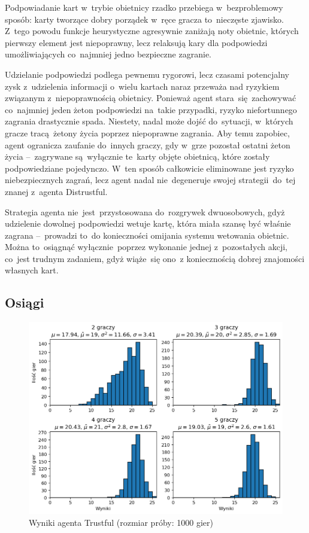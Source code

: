\documentclass[declaration,shortabstract,inz]{iithesis}
\begin{document}
Podpowiadanie kart w~trybie obietnicy rzadko przebiega w~bezproblemowy sposób: karty tworzące dobry porządek w~ręce gracza to~nieczęste zjawisko. Z~tego powodu funkcje heurystyczne agresywnie zaniżają noty obietnic, których pierwszy element jest niepoprawny, lecz relaksują kary dla podpowiedzi umożliwiających co~najmniej jedno bezpieczne zagranie.

Udzielanie podpowiedzi podlega pewnemu rygorowi, lecz czasami potencjalny zysk z~udzielenia informacji o~wielu kartach naraz przeważa nad ryzykiem związanym z~niepoprawnością obietnicy. Ponieważ agent stara~się zachowywać co~najmniej jeden żeton podpowiedzi na~takie przypadki, ryzyko niefortunnego zagrania drastycznie spada. Niestety, nadal może dojść do~sytuacji, w~których gracze tracą żetony życia poprzez niepoprawne zagrania. Aby temu zapobiec, agent ogranicza zaufanie do~innych graczy, gdy w~grze pozostał ostatni żeton życia --~zagrywane są~wyłącznie te~karty objęte obietnicą, które zostały podpowiedziane pojedynczo. W~ten sposób całkowicie eliminowane jest ryzyko niebezpiecznych zagrań, lecz agent nadal nie~degeneruje swojej strategii do~tej znanej z~agenta Distrustful.

Strategia agenta nie~jest~przystosowana do~rozgrywek dwuosobowych, gdyż udzielenie dowolnej podpowiedzi wetuje kartę, która miała szansę być właśnie zagrana --~prowadzi to~do konieczności omijania systemu wetowania obietnic. Można to~osiągnąć wyłącznie poprzez wykonanie jednej z~pozostałych akcji, co~jest trudnym zadaniem, gdyż wiąże~się ono~z koniecznością dobrej znajomości własnych kart.

\subsection*{Osiągi}

\begin{figure}[H]
	\centering
	\captionsetup{format=hang}
	\includegraphics[width=\textwidth,height=\textheight,keepaspectratio]{Trustful.png}
	\caption[Caption]{Wyniki agenta Trustful (rozmiar próby: 1000 gier)}
	\label{fig:Trustful}
\end{figure}
\end{document}

